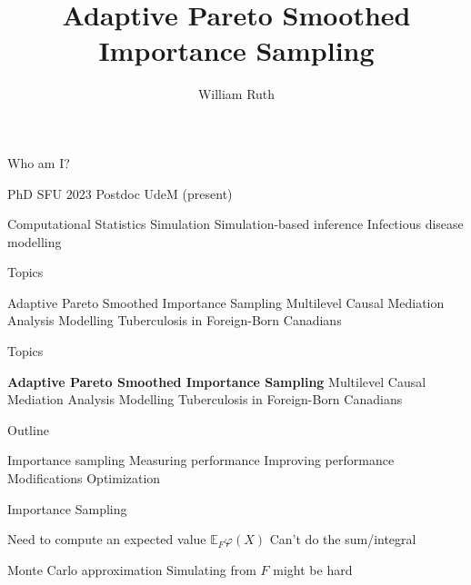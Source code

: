 \documentclass[14pt]{beamer}
\title[]{Adaptive Pareto Smoothed Importance Sampling}
\author{William Ruth}
\institute[]{Université de Montréal}
\date{\vspace{-3cm}}
\newcommand{\bE}{\mathbb{E}}
\begin{document}
\begin{frame}
    \titlepage
\end{frame}

\begin{frame}{Who am I?}
    \begin{outline}
        \1 PhD SFU 2023
        \1 Postdoc UdeM (present) \newline

        \1 Computational Statistics
            \2 Simulation
            \2 Simulation-based inference
        \1 Infectious disease modelling
    \end{outline}
\end{frame}

\begin{frame}{Topics}
    \begin{outline}
        \1 Adaptive Pareto Smoothed Importance Sampling \newline
        \1 Multilevel Causal Mediation Analysis \newline
        \1 Modelling Tuberculosis in Foreign-Born Canadians
    \end{outline}
\end{frame}

\begin{frame}{Topics}
    \begin{outline}
        \1 \textbf{Adaptive Pareto Smoothed Importance Sampling} \newline
        \1 Multilevel Causal Mediation Analysis \newline
        \1 Modelling Tuberculosis in Foreign-Born Canadians
    \end{outline}
\end{frame}

\begin{frame}{Outline}
    \begin{outline}
        \1 Importance sampling \newline
        \1 Measuring performance \newline
        \1 Improving performance
            \2 Modifications
            \2 Optimization
    \end{outline}
\end{frame}


\begin{frame}{Importance Sampling}
    \begin{outline}
        \1 Need to compute an expected value
            \2 $\bE_F \varphi(X)$
        \1 Can't do the sum/integral \newline

        \1 Monte Carlo approximation
            \2 Simulating from $F$ might be hard
    \end{outline}
    \begin{equation*}
    \end{equation*}
\end{frame}
\end{document}
